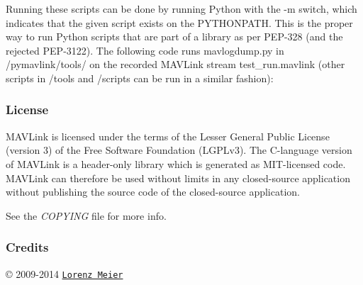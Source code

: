 Running these scripts can be done by running Python with the \textquotesingle{}-\/m\textquotesingle{} switch, which indicates that the given script exists on the P\+Y\+T\+H\+O\+N\+P\+A\+TH. This is the proper way to run Python scripts that are part of a library as per P\+E\+P-\/328 (and the rejected P\+E\+P-\/3122). The following code runs {\ttfamily mavlogdump.\+py} in {\ttfamily /pymavlink/tools/} on the recorded M\+A\+V\+Link stream {\ttfamily test\+\_\+run.\+mavlink} (other scripts in {\ttfamily /tools} and {\ttfamily /scripts} can be run in a similar fashion)\+: 


\subsubsection*{License}

M\+A\+V\+Link is licensed under the terms of the Lesser General Public License (version 3) of the Free Software Foundation (L\+G\+P\+Lv3). The C-\/language version of M\+A\+V\+Link is a header-\/only library which is generated as M\+I\+T-\/licensed code. M\+A\+V\+Link can therefore be used without limits in any closed-\/source application without publishing the source code of the closed-\/source application.

See the {\itshape C\+O\+P\+Y\+I\+NG} file for more info.

\subsubsection*{Credits}

\copyright{} 2009-\/2014 \href{mailto:mail@qgroundcontrol.org}{\tt Lorenz Meier} 
